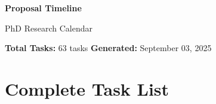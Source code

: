 \documentclass[portrait,a4paper]{article}
\begin{document}
\begin{titlepage}
\centering
\vspace*{0.5cm}

{\LARGE\textbf{Proposal Timeline}}

\vspace{0.3cm}
{\large PhD Research Calendar}

\vspace{0.5cm}

\begin{minipage}{0.95\textwidth}
\centering
\textbf{Total Tasks:} 63 tasks \hfill \textbf{Generated:} September 03, 2025
\end{minipage}

\vfill

\end{titlepage}

\newpage

\section{Complete Task List}
\vspace{0.1cm}
\end{document}

